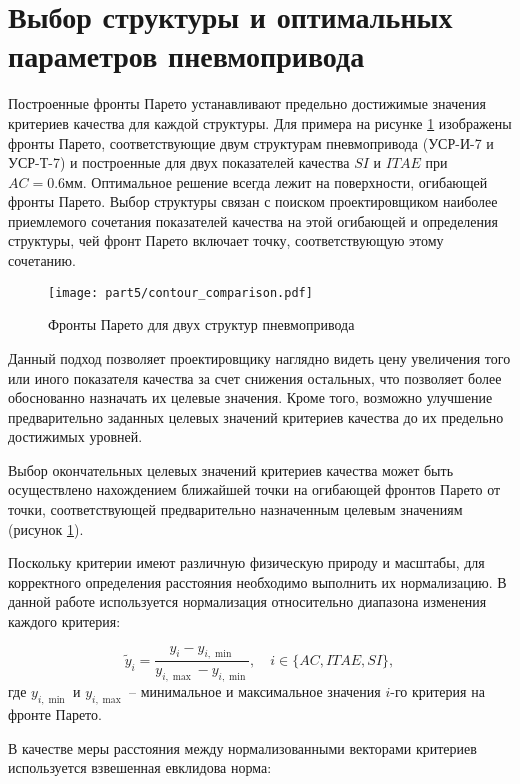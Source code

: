 \section{Выбор структуры и оптимальных параметров пневмопривода}\label{sec:inverse_optimization}

Построенные фронты Парето устанавливают предельно достижимые значения
критериев качества для каждой структуры. Для примера на рисунке \ref{fig:pareto_fronts_two}
изображены фронты Парето, соответствующие двум структурам пневмопривода (УСР-И-7 и УСР-Т-7)
и построенные для двух показателей качества $SI$ и $ITAE$ при $AC = \num{0.6}\text{мм}$. Оптимальное решение
всегда лежит на поверхности, огибающей фронты Парето. Выбор
структуры связан с поиском проектировщиком наиболее приемлемого сочетания
показателей качества на этой огибающей и определения структуры, чей фронт
Парето включает точку, соответствующую этому сочетанию.

\begin{figure}[h]
	\centering
	\texttt{[image: part5/contour\_comparison.pdf]}
	\caption{Фронты Парето для двух структур пневмопривода}
	\label{fig:pareto_fronts_two}
\end{figure}


Данный подход позволяет проектировщику наглядно видеть цену
увеличения того или иного показателя качества за счет снижения
остальных, что позволяет более обоснованно назначать их целевые
значения. Кроме того, возможно улучшение предварительно заданных
целевых значений критериев качества до их предельно достижимых уровней.

Выбор окончательных целевых значений критериев качества может
быть осуществлено нахождением ближайшей точки на огибающей фронтов
Парето от точки, соответствующей предварительно назначенным целевым значениям (рисунок \ref{fig:pareto_fronts_two}).

Поскольку критерии имеют различную физическую природу и масштабы, для корректного определения
расстояния необходимо выполнить их нормализацию.
В данной работе используется нормализация относительно диапазона изменения каждого критерия:

\begin{equation}\label{eq:normalization}
	\tilde{y}_i = \frac{y_i - y_{i,\min}}{y_{i,\max} - y_{i,\min}}, \quad i \in \{AC, ITAE, SI\},
\end{equation}
где $y_{i,\min}$ и $y_{i,\max}$ -- минимальное и максимальное значения $i$-го критерия на фронте Парето.

В качестве меры расстояния между нормализованными векторами критериев используется взвешенная евклидова норма:

